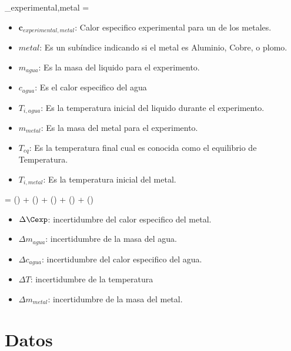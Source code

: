 \documentclass[12pt,a4paper]{config/myConfig}
\begin{document}
\begin{EquationLab}
{_{experimental,metal} = }
{\begin{itemize}[label=$\circ$, left=0pt]
    \item $\mathbf{c}_{experimental,metal}$: Calor especifico experimental para un de los metales.
    \item $metal$: Es un subíndice indicando si el metal es Aluminio, Cobre, o plomo.
    \item $m_{agua}$: Es la masa del liquido  para el experimento.
    \item $c_{agua}$: Es el calor especifico del agua
    \item $T_{i,agua}$: Es la temperatura inicial del liquido durante el experimento.
    \item $m_{metal}$: Es la masa del metal para el experimento.
    \item $T_{eq}$: Es la temperatura final cual es conocida como el equilibrio de Temperatura.
    \item $T_{i,metal}$: Es la temperatura inicial del metal.
\end{itemize}}
\end{EquationLab}

\begin{EquationLab}
    {\Delta\Cexp = 
    \left(\right) + 
    \left(\right) +
    \left(\right) +
    \left(\right) +
    \left(\right)
    }
    {\begin{itemize}[label=$\circ$, left=0pt]
        \item  $\Delta \Cexp$: incertidumbre del calor especifico del metal.
        \item $\Delta m_{agua}$: incertidumbre de la masa del agua.
        \item $\Delta c_{agua}$: incertidumbre del calor especifico del agua.
        \item $\Delta T$: incertidumbre de la temperatura
        \item $\Delta m_{metal}$: incertidumbre de la masa del metal.
    \end{itemize}}
\end{EquationLab}


\section{Datos}
\label{sec:DATOS}
\end{document}
